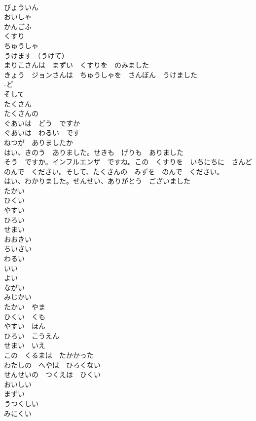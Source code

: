 \documentclass[8pt]{extreport}
\begin{document}
\begin{CJK}{UTF8}{min}
\\	びょういん	
\\	おいしゃ	
\\	かんごふ	
\\	くすり	
\\	ちゅうしゃ	
\\	うけます （うけて）	
\\	まりこさんは　まずい　くすりを　のみました	
\\	きょう　ジョンさんは　ちゅうしゃを　さんぼん　うけました	
\\	-ど	
\\	そして	
\\	たくさん	
\\	たくさんの	
\\	ぐあいは　どう　ですか	
\\	ぐあいは　わるい　です	
\\	ねつが　ありましたか	
\\	はい、きのう　ありました。せきも　げりも　ありました	
\\	そう　ですか。インフルエンザ　ですね。この　くすりを　いちにちに　さんど　のんで　ください。そして、たくさんの　みずを　のんで　ください。	
\\	はい、わかりました。せんせい、ありがとう　ございました	
\\	たかい	
\\	ひくい	
\\	やすい	
\\	ひろい	
\\	せまい	
\\	おおきい	
\\	ちいさい	
\\	わるい	
\\	いい	
\\	よい	
\\	ながい	
\\	みじかい	
\\	たかい　やま	
\\	ひくい　くも	
\\	やすい　ほん	
\\	ひろい　こうえん	
\\	せまい　いえ	
\\	この　くるまは　たかかった	
\\	わたしの　へやは　ひろくない	
\\	せんせいの　つくえは　ひくい	
\\	おいしい	
\\	まずい	
\\	うつくしい	
\\	みにくい	

\end{CJK}
\end{document}
